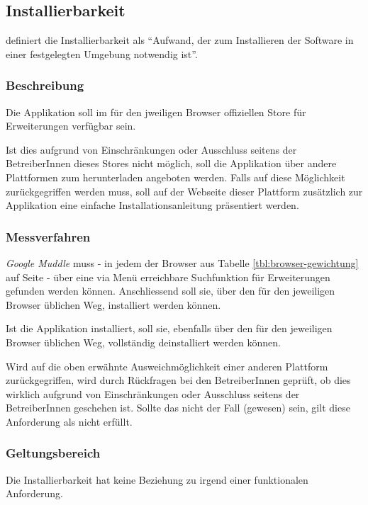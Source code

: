 \subsection{Installierbarkeit}
\label{subsec:nichtfunktionale-installierbarkeit}

\cite{iso:9126} definiert die Installierbarkeit als \enquote{Aufwand, der zum
Installieren der Software in einer festgelegten Umgebung notwendig ist}.

\subsubsection{Beschreibung}

Die Applikation soll im für den jweiligen Browser offiziellen Store für
Erweiterungen verfügbar sein.

Ist dies aufgrund von Einschränkungen oder Ausschluss seitens der BetreiberInnen
dieses Stores nicht möglich, soll die Applikation über andere Plattformen zum
herunterladen angeboten werden. Falls auf diese Möglichkeit zurückgegriffen
werden muss, soll auf der Webseite dieser Plattform zusätzlich zur Applikation
eine einfache Installationsanleitung präsentiert werden.

\subsubsection{Messverfahren}

\textit{Google Muddle} muss - in jedem der Browser aus Tabelle
\ref{tbl:browser-gewichtung} auf Seite \pageref{tbl:browser-gewichtung} - über
eine via Menü erreichbare Suchfunktion für Erweiterungen gefunden werden können.
Anschliessend soll sie, über den für den jeweiligen Browser üblichen Weg,
installiert werden können.

Ist die Applikation installiert, soll sie, ebenfalls über den für den jeweiligen
Browser üblichen Weg, vollständig deinstalliert werden können.

Wird auf die oben erwähnte Ausweichmöglichkeit einer anderen Plattform
zurückgegriffen, wird durch Rückfragen bei den BetreiberInnen geprüft, ob dies
wirklich aufgrund von Einschränkungen oder Ausschluss seitens der BetreiberInnen
geschehen ist. Sollte das nicht der Fall (gewesen) sein, gilt diese Anforderung
als nicht erfüllt.

\subsubsection{Geltungsbereich}

Die Installierbarkeit hat keine Beziehung zu irgend einer funktionalen
Anforderung.

